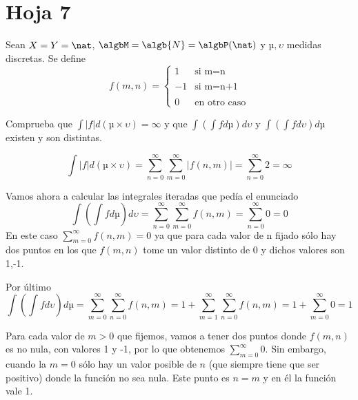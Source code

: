\section{Hoja 7}
\begin{problem}[1]
Sean $X=Y=\nat$, $\algbM=\algb{N}=\algbP(\nat)$ y $µ,\upsilon$ medidas discretas. Se define
\[f(m,n)= \left\{ \begin{array}{lcc}
             1 &   \text{si m=n} \\
             \\ -1 &  \text{si m=n+1} \\
             \\ 0 &  \text{en otro caso}
             \end{array}
   \right.\]

Comprueba que $\int |f|d(µ\times \upsilon)=\infty$ y que $\int(\int f dµ)d\upsilon$ y $\int(\int f d\upsilon)dµ$ existen y son distintas.
\solution

\[\int |f|d(µ\times \upsilon)=\sum_{n=0}^{\infty} \sum_{m=0}^{\infty}|f(n,m)| = \sum_{n=0}^{\infty} 2 = \infty\]

Vamos ahora a calcular las integrales iteradas que pedía el enunciado
\[\int\left(\int f dµ\right)d\upsilon = \sum_{n=0}^{\infty} \sum_{m=0}^{\infty}f(n,m) = \sum_{n=0}^{\infty} 0 = 0 \]
En este caso $\sum_{m=0}^{\infty}f(n,m) = 0$ ya que para cada valor de n fijado sólo hay dos puntos en los que $f(m,n)$ tome un valor distinto de 0 y dichos valores son 1,-1.

Por último
\[\int\left(\int f d\upsilon\right)dµ = \sum_{m=0}^{\infty} \sum_{n=0}^{\infty}f(n,m) = 1 + \sum_{m=1}^{\infty} \sum_{n=0}^{\infty}f(n,m) = 1+ \sum_{m=0}^{\infty} 0 = 1 \]

Para cada valor de $m > 0$ que fijemos, vamos a tener dos puntos donde $f(m,n)$ es no nula, con valores 1 y -1, por lo que obtenemos $\sum_{m=0}^{\infty} 0 $. Sin embargo, cuando la $m=0$ sólo hay un valor posible de $n$ (que siempre tiene que ser positivo) donde la función no sea nula. Este punto es $n=m$ y en él la función vale 1.
\end{problem}

